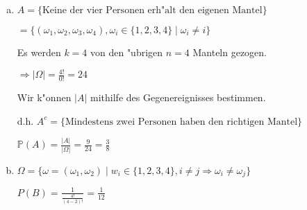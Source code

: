 \documentclass[a4paper,12pt]{article}
\begin{document}
    \begin{enumerate}[(a)]
        \item 
        $ A = \{\text{Keine der vier Personen erh"alt den eigenen Mantel}\} $

        $ = \{(\omega_1, \omega_2, \omega_3, \omega_4), \omega_i \in \{1, 2, 3, 4\} \mid \omega_i \neq i\} $

        Es werden $ k = 4 $ von den "ubrigen $ n = 4 $ Manteln gezogen.

        $ \displaystyle \Rightarrow |\Omega| = \frac{4!}{0!} = 24 $

        Wir k"onnen $ |A| $ mithilfe des Gegenereignisses bestimmen.

        d.h. $ A^c = \{\text{Mindestens zwei Personen haben den richtigen Mantel}\} $

        $ \displaystyle \mathbb{P}(A) = \frac{|A|}{|\Omega|} = \frac{9}{24} = \frac{3}{8} $

        \item
        $ \Omega = \{\omega = (\omega_1, \omega_2) \mid w_i \in \{1, 2, 3, 4\}, i \neq j \Rightarrow \omega_i \neq \omega_j\} $

        $ \displaystyle P(B) = \frac{1}{\frac{4!}{(4 - 2)!}} = \frac{1}{12} $
    \end{enumerate}
\end{document}
